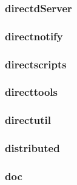 \documentclass[a4paper]{article}
\begin{document}
\clearpage\subsubsection[directdServer]{directdServer}
\hypertarget{RefHeading17811167907073}{}\subsubsection{}
\clearpage\subsubsection[directnotify]{directnotify}
\hypertarget{RefHeading17831167907073}{}\subsubsection{}
\clearpage\subsubsection[directscripts]{directscripts}
\hypertarget{RefHeading17851167907073}{}\subsubsection{}
\clearpage\subsubsection[directtools]{directtools}
\hypertarget{RefHeading17871167907073}{}\subsubsection{}
\clearpage\subsubsection[directutil]{directutil}
\hypertarget{RefHeading17891167907073}{}\subsubsection{}
\clearpage\subsubsection[distributed]{distributed}
\hypertarget{RefHeading17911167907073}{}\subsubsection{}
\clearpage\subsubsection[doc]{doc}
\end{document}
